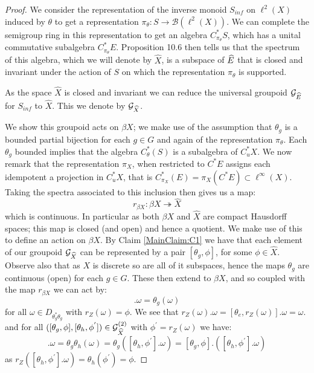 \begin{conjecture}
\begin{proof}
We consider the representation of the inverse monoid $S_{inf}$ on $\ell^{2}(X)$ induced by $\theta$ to get a representation $\pi_{\theta}:S \rightarrow \mathcal{B}(\ell^{2}(X))$. We can complete the semigroup ring in this representation to get an algebra $C^{*}_{\pi_{\theta}}S$, which has a unital commutative subalgebra $C^{*}_{\pi_{\theta}}E$. Proposition 10.6 \cite{MR2419901} then tells us that the spectrum of this algebra, which we will denote by $\widehat{X}$, is a subspace of $\widehat{E}$ that is closed and invariant under the action of $S$ on which the representation $\pi_{\theta}$ is supported.

As the space $\widehat{X}$ is closed and invariant we can reduce the universal groupoid $\mathcal{G}_{\widehat{E}}$ for $S_{inf}$ to $\widehat{X}$. This we denote by $\mathcal{G}_{\widehat{X}}$. 

We show this groupoid acts on $\beta X$; we make use of the assumption that $\theta_{g}$ is a bounded partial bijection for each $g \in G$ and again of the representation $\pi_{\theta}$. Each $\theta_{g}$ bounded implies that the algebra $C^{*}_{\theta}(S)$ is a subalgebra of $C^{*}_{u}X$. We now remark that the representation $\pi_{X}$, when restricted to $C^{*}E$ assigns each idempotent a projection in $C^{*}_{u}X$, that is $C^{*}_{\pi_{X}}(E)=\pi_{X}(C^{*}E) \subset \ell^{\infty}(X)$. Taking the spectra associated to this inclusion then gives us a map:
\begin{equation*}
r_{\beta X}: \beta X \twoheadrightarrow \widehat{X}
\end{equation*}
which is continuous. In particular as both $\beta X$ and $\widehat{X}$ are compact Hausdorff spaces; this map is closed (and open) and hence a quotient. We make use of this to define an action on $\beta X$. By Claim \ref{MainClaim:C1} we have that each element of our groupoid $\mathcal{G}_{\widehat{X}}$ can be represented by a pair $[\theta_{g}, \phi]$, for some $\phi \in \widehat{X}$. Observe also that as $X$ is discrete so are all of it subspaces, hence the maps $\theta_{g}$ are continuous (open) for each $g \in G$. These then extend to $\beta X$, and so coupled with the map $r_{\beta X}$ we can act by:
\begin{equation*}
[\theta_{g},\phi].\omega = \theta_{g}(\omega)
\end{equation*}
for all $\omega \in D_{\theta_{g}^{*}\theta_{g}}$ with $r_{Z}(\omega) = \phi$. We see that $r_{Z}(\omega).\omega= [\theta_{e}, r_{Z}(\omega)].\omega = \omega.$ and for all $([\theta_{g},\phi],[\theta_{h},\phi^{'}]) \in \mathcal{G}_{\widehat{X}}^{(2)}$ with $\phi^{'}=r_{Z}(\omega)$ we have:
\begin{equation*}
[\theta_{g}\theta_{h},\phi^{'}].\omega = \theta_{g}\theta_{h}(\omega) = \theta_{g}([\theta_{h},\phi^{'}].\omega)=[\theta_{g},\phi].([\theta_{h},\phi^{'}].\omega)
\end{equation*}
as $r_{Z}([\theta_{h},\phi^{'}].\omega)=\theta_{h}(\phi^{'})=\phi$.


\end{proof}
\end{conjecture}
